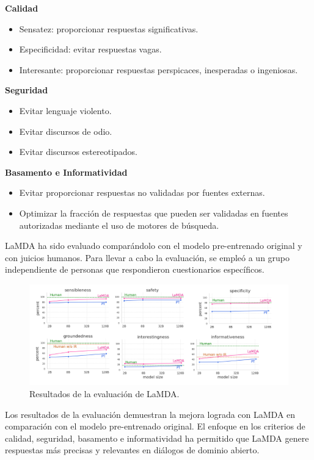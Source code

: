 \textbf{Calidad}
\begin{itemize}
\item Sensatez: proporcionar respuestas significativas.
\item Especificidad: evitar respuestas vagas.
\item Interesante: proporcionar respuestas perspicaces, inesperadas o ingeniosas.
\end{itemize}

\textbf{Seguridad}
\begin{itemize}
\item Evitar lenguaje violento.
\item Evitar discursos de odio.
\item Evitar discursos estereotipados.
\end{itemize}

\textbf{Basamento e Informatividad}
\begin{itemize}
\item Evitar proporcionar respuestas no validadas por fuentes externas.
\item Optimizar la fracción de respuestas que pueden ser validadas en fuentes autorizadas mediante el uso de motores de búsqueda.
\end{itemize}

LaMDA ha sido evaluado comparándolo con el modelo pre-entrenado original y con juicios humanos. Para llevar a cabo la evaluación, se empleó a un grupo independiente de personas que respondieron cuestionarios específicos.

\begin{figure}[h]
	\centering
	\includegraphics[scale = 0.45]{pics/lambdaresults.png}
	\caption{Resultados de la evaluación de LaMDA.}
\end{figure}

Los resultados de la evaluación demuestran la mejora lograda con LaMDA en comparación con el modelo pre-entrenado original. El enfoque en los criterios de calidad, seguridad, basamento e informatividad ha permitido que LaMDA genere respuestas más precisas y relevantes en diálogos de dominio abierto.


